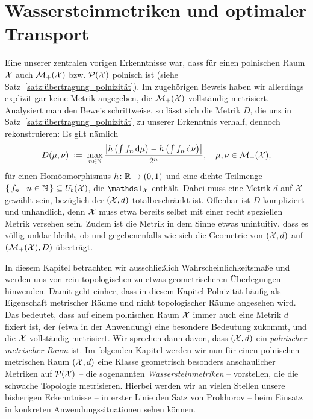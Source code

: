 \documentclass[../thesis/thesis.tex]{subfiles}
\begin{document}
	
	\chapter{Wassersteinmetriken und optimaler Transport}
	\label{chap:wassersteinmetriken}
	
	Eine unserer zentralen vorigen Erkenntnisse war, dass für einen polnischen Raum $\mathcal{X}$ auch $\mathcal{M}_{+}(\mathcal{X})$ bzw. $\mathcal{P}(\mathcal{X})$ polnisch ist (siehe Satz~\ref{satz:übertragung_polnizität}). 
	Im zugehörigen Beweis haben wir allerdings explizit gar keine Metrik angegeben, die $\mathcal{M}_{+}(\mathcal{X})$ vollständig metrisiert. Analysiert man den Beweis schrittweise, so lässt sich die Metrik $D$,
	die uns in Satz~\ref{satz:übertragung_polnizität} zu unserer Erkenntnis verhalf, dennoch rekonstruieren: Es gilt nämlich
	\[ D(\mu, \nu) \; \vcentcolon = \; \max_{n \in \mathbb{N}} \frac{\left| h\left( \int_{} \, f_n \, \mathrm{d}\mu \right) - h\left(\int_{} \, f_n \, \mathrm{d}\nu \right) \right|}{2^n}, \quad \mu, \nu \in \mathcal{M}_{+}(\mathcal{X}) \text{,} \]
	für einen Homöomorphismus $h \colon \mathbb{R} \to (0, 1)$ und eine dichte Teilmenge $\left\{\, f_n \; \middle| \; n \in \mathbb{N} \,\right\} \subseteq U_b(\mathcal{X})$, die $\indfct_{\X}$ enthält. Dabei muss eine Metrik $d$ auf $\mathcal{X}$ gewählt sein, 
	bezüglich der $(\mathcal{X}, d)$ totalbeschränkt ist.
	Offenbar ist $D$ kompliziert und unhandlich, denn $\mathcal{X}$ muss etwa bereits selbst mit einer recht speziellen Metrik versehen sein. Zudem ist die Metrik in dem Sinne etwas unintuitiv, dass es völlig unklar bleibt, 
	ob und gegebenenfalls wie sich die Geometrie von $(\mathcal{X}, d)$ auf $(\mathcal{M}_{+}(\mathcal{X}), D)$ überträgt.
	
	In diesem Kapitel betrachten wir ausschließlich Wahrscheinlichkeitsmaße und werden uns von rein topologischen zu etwas geometrischeren Überlegungen hinwenden. Damit geht einher, dass in diesem Kapitel
	Polnizität häufig als Eigenschaft metrischer Räume und nicht topologischer Räume angesehen wird. Das bedeutet, dass auf einem polnischen Raum $\mathcal{X}$ immer auch eine Metrik $d$ fixiert ist, der (etwa in der Anwendung)
	eine besondere Bedeutung zukommt, und die $\mathcal{X}$ vollständig metrisiert. Wir sprechen dann davon, dass $(\mathcal{X}, d)$ ein \emph{polnischer metrischer Raum} ist.
	Im folgenden Kapitel werden wir nun für einen polnischen metrischen Raum $(\mathcal{X}, d)$ eine Klasse geometrisch besonders anschaulicher Metriken auf $\mathcal{P}(\mathcal{X})$
	-- die sogenannten \emph{Wassersteinmetriken} -- vorstellen, die die schwache Topologie metrisieren. Hierbei werden wir an vielen Stellen unsere bisherigen 
	Erkenntnisse -- in erster Linie den Satz von Prokhorov -- beim Einsatz in konkreten Anwendungssituationen sehen können. 
	
\end{document}
